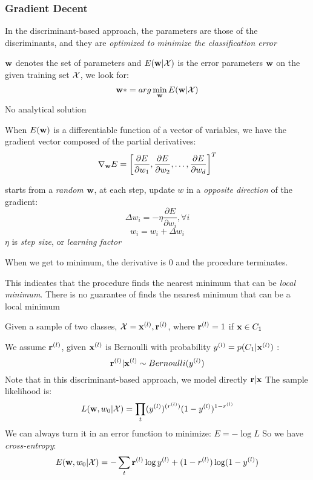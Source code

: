         \subsubsection{Gradient Decent}
    In the discriminant-based approach, the parameters are those of the
        discriminants, and they are \emph{optimized to minimize the
        classification error}
        \begin{description}
    \item[Error]$\mathbf{w}$ denotes the set of parameters and $E(\mathbf{w}|\mathcal{X})$ is the
        error parameters $\mathbf{w}$ on the given training set 
        $\mathcal{X}$, we look for: 
        \[ \mathbf{w}*= arg\min_{\mathbf{w}}E(\mathbf{w}|\mathcal{X})\]
        No analytical solution
    \item[Gradient Vector] When $E(\mathbf{w})$ is a differentiable function of a
        vector of variables, we have the gradient vector composed of the
           partial derivatives:
            \[ \nabla_{\mathbf{w}} E = \left[ \frac{\partial E}{\partial w_1},
                \frac{\partial E}{\partial w_2}, \dots, \frac{\partial
                E}{\partial w_d} \right]^T
                \]
            \item [Gradient Descent] starts from a \emph{random} $\mathbf{w}$, at each
                step, update $w$ in a \emph{opposite direction} of the gradient:
                \[\Delta w_i = - \eta\frac{\partial E}{\partial w_i}, \forall i
                    \]
                \[ w_i = w_i + \Delta w_i \]
                $\eta$ is \emph{step size}, or \emph{learning factor}

                When we get to minimum, the derivative is 0 and the procedure
                terminates.

            \item This indicates that the procedure finds the nearest minimum
                that can be \emph{local minimum}. There is no guarantee of
                finds the nearest minimum that can be a local minimum
    \item [Learning parameters]
        Given a sample of two classes, $\mathcal{X} = {\mathbf{x}^{(l)}, \mathbf{r}^{(l)}}$, where $\mathbf{r}^{(l)}
        = 1$ if $\mathbf{x}\in C_1$

        We assume $\mathbf{r}^{(l)}$, given $\mathbf{x}^{(l)}$ is Bernoulli with probability $y^{(l)} =
        p(C_1|\mathbf{x}^{(l)})$ :
        \[\mathbf{r}^{(l)}|\mathbf{x}^{(l)} \sim Bernoulli(y^{(l)}) \]
        Note that in this discriminant-based approach, we model directly $\mathbf{r}|\mathbf{x}$
        The sample likelihood is:
        \[ L(\mathbf{w},w_0|\mathcal{X}) = \prod_t(y^{(l)})^{(r^{(l)})}(1-y^{(l)})^{1-r^{(l)}}
            \]
        We can always turn it in an error function to minimize: $E = -\log L$
        So we have \emph{cross-entropy}:
        \[ E(\mathbf{w}, w_0| \mathcal{X}) = -\sum_t \mathbf{r}^{(l)}\log y^{(l)} + (1-r^{(l)})\log(1 - y^{(l)}) \]


\end{description}
